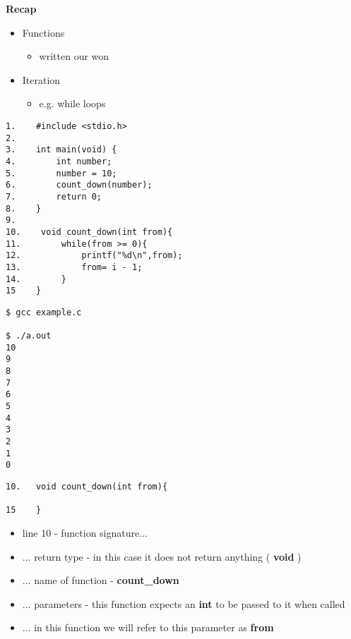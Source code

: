 \documentclass{beamer}
\begin{document}
\begin{frame}
\begin{center}
\textbf{Recap}
\end{center}
\begin{itemize}
\item Functions
\begin{itemize}
\item written our won
\end{itemize}
\bigskip
\item Iteration 
\begin{itemize}
\item e.g. while loops
\end{itemize}
\end{itemize}
\end{frame}

\begin{frame}[fragile]
\begin{block}{}
\begin{lstlisting}
1.    #include <stdio.h>
2.     
3.    int main(void) {
4.        int number;
5.        number = 10;
6.        count_down(number);
7.        return 0;
8.    }
9.
10.    void count_down(int from){
11.        while(from >= 0){
12.            printf("%d\n",from);
13.            from= i - 1;
14.        }
15    }
\end{lstlisting}
\end{block}
\end{frame}

\begin{frame}[fragile]
\begin{block}{}
\begin{lstlisting}
$ gcc example.c

$ ./a.out
10
9
8
7
6
5
4
3
2
1
0
\end{lstlisting}
\end{block}
\end{frame}

\begin{frame}[fragile]
\begin{block}{}
\begin{lstlisting}
10.   void count_down(int from){
    
15    }
\end{lstlisting}
\end{block}
\begin{itemize}
\item line 10 - function signature...
\item ... return type - in this case it does not return anything ( \textbf{void} )
\item ... name of function - \textbf{count\_down}
\item ... parameters - this function expects an \textbf{int} to be passed to it when called
\item ... in this function we will refer to this parameter as \textbf{from}
\end{itemize}
\end{frame}
\end{document}
